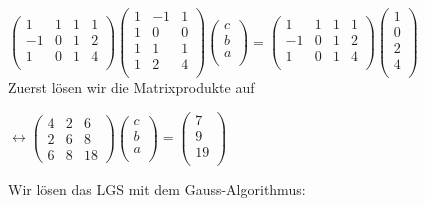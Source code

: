 \documentclass[10pt,a4paper]{article}
\begin{document}
$\begin{pmatrix}
    1 & 1 & 1 & 1\\
    -1 & 0  & 1 & 2\\
    1 & 0  & 1 & 4 \\
\end{pmatrix}
\begin{pmatrix}
    1 & -1 & 1 \\
    1 & 0  & 0 \\
    1 & 1  & 1 \\
    1 & 2  & 4 \\
   \end{pmatrix} 
   \begin{pmatrix}
    c \\
    b \\
    a \\
\end{pmatrix} = 
\begin{pmatrix}
    1 & 1 & 1 & 1\\
    -1 & 0  & 1 & 2\\
    1 & 0  & 1 & 4 \\
\end{pmatrix} 
\begin{pmatrix}
    1 \\
    0 \\
    2 \\
    4 \\
\end{pmatrix}$  \\


Zuerst lösen wir die Matrixprodukte auf

$
\leftrightarrow
\begin{pmatrix}
    4 & 2 & 6\\
    2 & 6 & 8\\
    6 & 8 & 18
\end{pmatrix}
\begin{pmatrix}
    c \\
    b \\
    a \\
\end{pmatrix} 
=
\begin{pmatrix}
    7 \\
    9 \\
    19 \\
\end{pmatrix} 
$ 

Wir lösen das LGS mit dem Gauss-Algorithmus:\\
\end{document}
